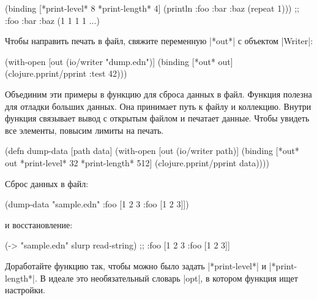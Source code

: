 \begin{english}
  \begin{clojure}
(binding [*print-level* 8
          *print-length* 4]
  (println {:foo {:bar {:baz (repeat 1)}}}))
;; {:foo {:bar {:baz (1 1 1 1 ...)}}}
  \end{clojure}
\end{english}

Чтобы направить печать в файл, свяжите переменную \spverb|*out*| с объектом
\spverb|Writer|:

\begin{english}
  \begin{clojure}
(with-open [out (io/writer "dump.edn")]
  (binding [*out* out]
    (clojure.pprint/pprint {:test 42})))
  \end{clojure}
\end{english}

Объединим эти примеры в функцию для сброса данных в файл. Функция полезна для
отладки больших данных. Она принимает путь к файлу и коллекцию. Внутри функция
связывает вывод с открытым файлом и печатает данные. Чтобы увидеть все элементы,
повысим лимиты на печать.

\begin{english}
  \begin{clojure}
(defn dump-data
  [path data]
  (with-open [out (io/writer path)]
    (binding [*out* out
              *print-level* 32
              *print-length* 512]
      (clojure.pprint/pprint data))))
  \end{clojure}
\end{english}

\noindent
Сброс данных в файл:

\begin{english}
  \begin{clojure}
(dump-data "sample.edn" {:foo [1 2 3 {:foo [1 2 3]}]})
  \end{clojure}
\end{english}

\noindent
и восстановление:

\begin{english}
  \begin{clojure}
(-> "sample.edn" slurp read-string)
;; {:foo [1 2 3 {:foo [1 2 3]}]}
  \end{clojure}
\end{english}

Доработайте функцию так, чтобы можно было задать \spverb|*print-level*| и
\spverb|*print-length*|. В идеале это необязательный словарь \spverb|opt|, в
котором функция ищет настройки.

